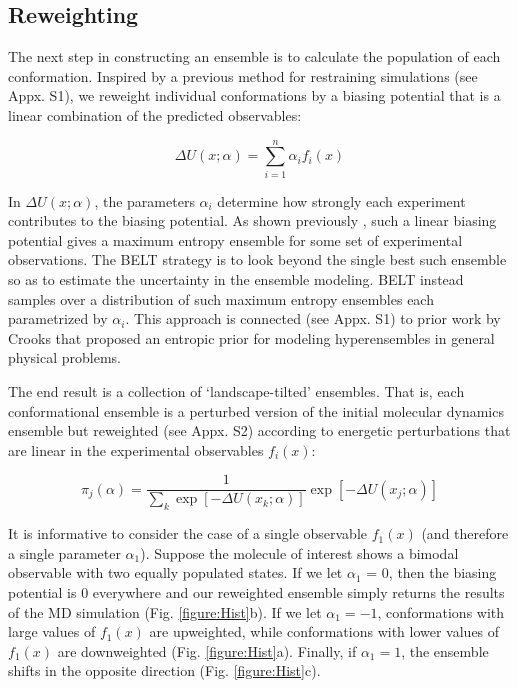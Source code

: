 \documentclass[journal=jacsat,manuscript=article]{achemso}
\begin{document}
\subsection*{Reweighting}

The next step in constructing an ensemble is to calculate the population of each conformation.  Inspired by a previous method for restraining simulations  \cite{chodera2012} (see Appx. S1), we reweight individual conformations by a biasing potential that is a linear combination of the predicted observables:

$$\Delta U(x;\alpha) = \sum_{i=1}^n \alpha_i f_i(x)$$

In $\Delta U(x;\alpha)$, the parameters $\alpha_i$ determine how strongly each experiment contributes to the biasing potential.  As shown previously \cite{chodera2012}, such a linear biasing potential gives a maximum entropy ensemble for some set of experimental observations. The BELT strategy is to look beyond the single best such ensemble so as to estimate the uncertainty in the ensemble modeling. BELT instead samples over a distribution of such maximum entropy ensembles each parametrized by $\alpha_i$. This approach is connected (see Appx. S1) to prior work by Crooks that proposed an entropic prior for modeling hyperensembles in general physical problems. 

The end result is a collection of `landscape-tilted' ensembles. That is, each conformational ensemble is a perturbed version of the initial molecular dynamics ensemble but reweighted (see Appx. S2) according to energetic perturbations that are linear in the experimental observables $f_i(x)$:

$$\pi_j(\alpha) = \frac{1}{\sum_k \exp[-\Delta U(x_k;\alpha)]} \exp[-\Delta U(x_j;\alpha)]$$

It is informative to consider the case of a single observable $f_1(x)$ (and therefore a single parameter $\alpha_1$).  Suppose the molecule of interest shows a bimodal observable with two equally populated states.  If we let $\alpha_1$ = 0, then the biasing potential is $0$ everywhere and our reweighted ensemble simply returns the results of the MD simulation (Fig. \ref{figure:Hist}b).  If we let $\alpha_1 = -1$, conformations with large values of $f_1(x)$ are upweighted, while conformations with lower values of $f_1(x)$ are downweighted (Fig. \ref{figure:Hist}a).  Finally, if $\alpha_1 = 1$, the ensemble shifts in the opposite direction (Fig. \ref{figure:Hist}c).  
\end{document}
